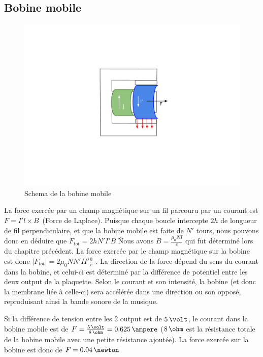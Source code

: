 \subsection[a]{Bobine mobile}

\begin{figure}	
\begin{center}
\includegraphics[scale=0.5]{img/bobine-mobile}
\end{center}
\caption{Schema de la bobine mobile}		
\label{fig:bobinemobile}		
\end{figure}

La force exercée par un champ magnétique sur un fil parcouru par un courant est $F =  I' l \times B$\, (Force de Laplace). Puisque 
chaque boucle intercepte $2h$ de longueur de fil perpendiculaire, et que la bobine mobile est faite de $N'$ tours, nous pouvons
donc en déduire que $F_{tot} = 2 h N' I' B$ \. Nous avons $B = \frac{\mu_0 N I}{e}$ qui fut déterminé 
lors du chapitre précédent. La force exercée par le champ magnétique sur la bobine est donc 
$ |F_{tot}| = 2 \mu_0 N N' I I' \frac{h}{e}$ . La direction de la force dépend du sens du courant dans la bobine, et 
celui-ci est déterminé par la différence de potentiel entre les deux output de la plaquette. Selon le courant et son
intensité, la bobine (et donc la membrane liée à celle-ci) sera accélérée dans une direction ou son opposé, reproduisant 
ainsi la bande sonore de la musique.

Si la différence de tension entre les 2 output est de $5\,\volt$, le courant dans la bobine mobile est de 
$I' = \frac{5\,\volt}{8\,\ohm} = 0.625\,\ampere$ ($8\,\ohm$ est la résistance totale de la bobine mobile avec une petite 
résistance ajoutée). La force exercée sur la bobine est donc de $F = 0.04\,\newton$

